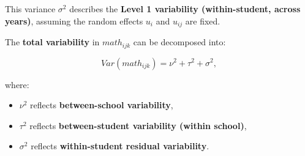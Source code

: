 \documentclass[
  letterpaper,
  DIV=11,
  numbers=noendperiod]{scrreprt}
\providecommand{\tightlist}{%
  \setlength{\itemsep}{0pt}\setlength{\parskip}{0pt}}\usepackage{longtable,booktabs,array}
\begin{document}
This variance \(\sigma^2\) describes the \textbf{Level 1 variability
(within-student, across years)}, assuming the random effects \(u_i\) and
\(u_{ij}\) are fixed.

The \textbf{total variability} in \(math_{ijk}\) can be decomposed into:

\[
Var(math_{ijk}) = \nu^2 + \tau^2 + \sigma^2,
\]

where:

\begin{itemize}
\tightlist
\item
  \(\nu^2\) reflects \textbf{between-school variability},
\item
  \(\tau^2\) reflects \textbf{between-student variability (within
  school)},
\item
  \(\sigma^2\) reflects \textbf{within-student residual variability}.
\end{itemize}
\end{document}
